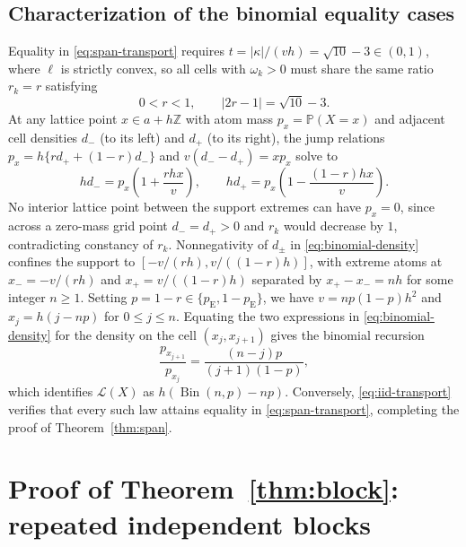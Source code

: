 \documentclass[11pt]{article}
\numberwithin{equation}{section}
\theoremstyle{remark}
\DeclareMathOperator{\Bin}{Bin}
\newcommand{\Pp}{\mathbb P}
\newcommand{\Z}{\mathbb Z}
\newcommand{\Law}{\mathcal L}
\begin{document}
\subsection{Characterization of the binomial equality cases}

Equality in \eqref{eq:span-transport} requires $t=|\kappa|/(vh)=\sqrt{10}-3\in(0,1)$,
where $\ell$ is strictly convex, so all cells with $\omega_k>0$ must share the
same ratio $r_k=r$ satisfying
\begin{equation}\label{eq:r-optimal}
                 0<r<1,\qquad |2r-1|=\sqrt{10}-3.
\end{equation}
At any lattice point $x\in a+h\Z$ with atom mass $p_x=\Pp(X=x)$ and adjacent
cell densities $d_-$ (to its left) and $d_+$ (to its right), the jump
relations $p_x=h\{rd_++(1-r)d_-\}$ and $v(d_--d_+)=xp_x$ solve to
\begin{equation}\label{eq:binomial-density}
 hd_-=p_x\left(1+\frac{rhx}{v}\right),\qquad
 hd_+=p_x\left(1-\frac{(1-r)hx}{v}\right).
\end{equation}
No interior lattice point between the support extremes can have $p_x=0$,
since across a zero-mass grid point $d_-=d_+>0$ and $r_k$ would decrease by
$1$, contradicting constancy of $r_k$. Nonnegativity of $d_\pm$ in
\eqref{eq:binomial-density} confines the support to $[-v/(rh),v/((1-r)h)]$,
with extreme atoms at $x_-=-v/(rh)$ and $x_+=v/((1-r)h)$ separated by
$x_+-x_-=nh$ for some integer $n\ge1$. Setting $p=1-r\in\{p_{\mathrm E},1-p_{\mathrm E}\}$,
we have $v=np(1-p)h^2$ and $x_j=h(j-np)$ for $0\le j\le n$. Equating the two
expressions in \eqref{eq:binomial-density} for the density on the cell
$(x_j,x_{j+1})$ gives the binomial recursion
\[
             \frac{p_{x_{j+1}}}{p_{x_j}}
                    =\frac{(n-j)p}{(j+1)(1-p)},
\]
which identifies $\Law(X)$ as $h(\Bin(n,p)-np)$. Conversely,
\eqref{eq:iid-transport} verifies that every such law attains equality in
\eqref{eq:span-transport}, completing the proof of Theorem~\ref{thm:span}.

\section{Proof of Theorem~\ref{thm:block}: repeated independent blocks}\label{sec:block}
\end{document}
